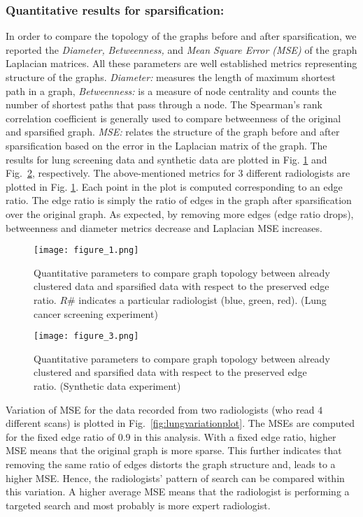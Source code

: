 \documentclass[preprint,12pt]{elsarticle}
\begin{document}
\subsubsection{Quantitative results for sparsification:} In order to compare the topology of the graphs before and after sparsification, we reported the \textit{Diameter,} \textit{Betweenness,} and \textit{Mean Square Error (MSE)} of the graph Laplacian matrices. All these parameters are well established metrics representing structure of the graphs. \textit{Diameter:} measures the length of maximum shortest path in a graph, \textit{Betweenness:} is a measure of node centrality and counts the number of shortest paths that pass through a node. The Spearman's rank correlation coefficient is generally used to compare betweenness of the original and sparsified graph. \textit{MSE:} relates the structure of the graph before and after sparsification based on the error in the Laplacian matrix of the graph. The results for lung screening data and synthetic data are plotted in Fig. \ref{fig:lungplot} and Fig.~\ref{fig:syntheticplot}, respectively. The above-mentioned metrics for $3$ different radiologists are plotted in Fig. \ref{fig:lungplot}. Each point in the plot is computed corresponding to an edge ratio. The edge ratio is simply the ratio of edges in the graph after sparsification over the original graph. As expected, by removing more edges (edge ratio drops), betweenness and diameter metrics decrease and Laplacian MSE increases. 

\begin{figure}[h]
\centering
\texttt{[image: figure\_1.png]}
\caption{Quantitative parameters to compare graph topology between already clustered data and sparsified  data with respect to the preserved edge ratio. $R\#$ indicates a particular radiologist (blue, green, red). (Lung cancer screening experiment)\label{fig:lungplot}}
\end{figure}

\begin{figure}[h]
\centering
\texttt{[image: figure\_3.png]}
\caption{Quantitative parameters to compare graph topology between already clustered and sparsified  data with respect to the preserved edge ratio. (Synthetic data experiment)\label{fig:syntheticplot}}
\end{figure}

Variation of MSE for the data recorded from two radiologists (who read $4$ different scans) is plotted in Fig.~\ref{fig:lungvariationplot}. The MSEs are computed for the fixed edge ratio of $0.9$ in this analysis. With a fixed edge ratio, higher MSE means that the original graph is more sparse. This further indicates that removing the same ratio of edges distorts the graph structure and, leads to a higher MSE. Hence, the radiologists' pattern of search can be compared within this variation. A higher average MSE means that the radiologist is performing a targeted search and most probably is more expert radiologist.
\end{document}
